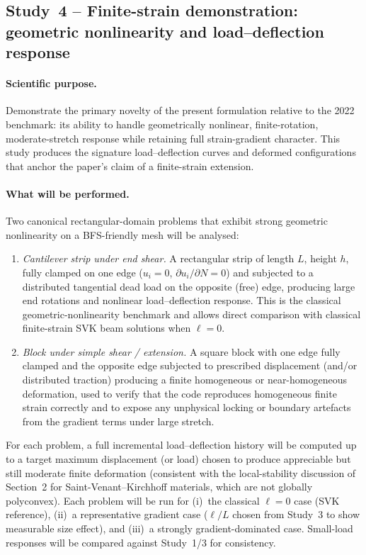 \documentclass[11pt]{article}
\begin{document}
\subsection{Study~4 -- Finite-strain demonstration: geometric
  nonlinearity and load--deflection response}
\label{ssec:s9_study4}

\paragraph{Scientific purpose.}
Demonstrate the primary novelty of the present formulation
relative to the 2022 benchmark: its ability to handle
geometrically nonlinear, finite-rotation, moderate-stretch
response while retaining full strain-gradient character.  This
study produces the signature load--deflection curves and
deformed configurations that anchor the paper's claim of a
finite-strain extension.

\paragraph{What will be performed.}
Two canonical rectangular-domain problems that exhibit strong
geometric nonlinearity on a BFS-friendly mesh will be analysed:
\begin{enumerate}
  \item[(a)] \emph{Cantilever strip under end shear.}  A
    rectangular strip of length $L$, height $h$, fully clamped
    on one edge ($u_i=0$, $\partial u_i/\partial N=0$) and
    subjected to a distributed tangential dead load on the
    opposite (free) edge, producing large end rotations and
    nonlinear load--deflection response.  This is the
    classical geometric-nonlinearity benchmark and allows
    direct comparison with classical finite-strain SVK beam
    solutions when $\ell=0$.
  \item[(b)] \emph{Block under simple shear / extension.}  A
    square block with one edge fully clamped and the opposite
    edge subjected to prescribed displacement (and/or
    distributed traction) producing a finite homogeneous or
    near-homogeneous deformation, used to verify that the code
    reproduces homogeneous finite strain correctly and to
    expose any unphysical locking or boundary artefacts from
    the gradient terms under large stretch.
\end{enumerate}
For each problem, a full incremental load--deflection history
will be computed up to a target maximum displacement (or load)
chosen to produce appreciable but still moderate finite
deformation (consistent with the local-stability discussion of
Section~2 for Saint-Venant--Kirchhoff materials, which are not
globally polyconvex).  Each problem will be run for (i)~the
classical $\ell=0$ case (SVK reference), (ii)~a representative
gradient case ($\ell/L$ chosen from Study~3 to show measurable
size effect), and (iii)~a strongly gradient-dominated case.
Small-load responses will be compared against Study~1/3 for
consistency.
\end{document}

